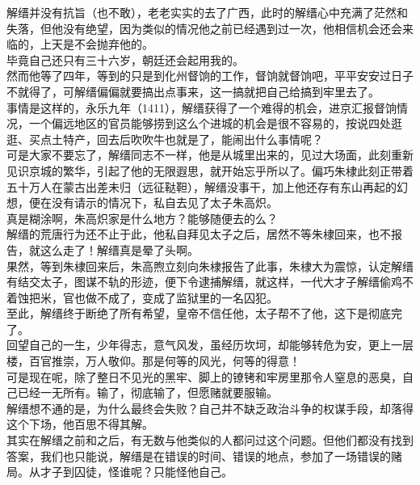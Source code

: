 \begin{multicols}{\theparacolNo}
解缙并没有抗旨（也不敢），老老实实的去了广西，此时的解缙心中充满了茫然和失落，但他没有绝望，因为类似的情况他之前已经遇到过一次，他相信机会还会来临的，上天是不会抛弃他的。\\

毕竟自己还只有三十六岁，朝廷还会起用我的。\\

然而他等了四年，等到的只是到化州督饷的工作，督饷就督饷吧，平平安安过日子不就得了，可解缙偏偏就要搞出点事来，这一搞就把自己给搞到牢里去了。\\

事情是这样的，永乐九年（1411），解缙获得了一个难得的机会，进京汇报督饷情况，一个偏远地区的官员能够捞到这么个进城的机会是很不容易的，按说四处逛逛、买点土特产，回去后吹吹牛也就是了，能闹出什么事情呢？\\

可是大家不要忘了，解缙同志不一样，他是从城里出来的，见过大场面，此刻重新见识京城的繁华，引起了他的无限遐思，就开始忘乎所以了。偏巧朱棣此刻正带着五十万人在蒙古出差未归（远征鞑靼），解缙没事干，加上他还存有东山再起的幻想，便在没有请示的情况下，私自去见了太子朱高炽。\\

真是糊涂啊，朱高炽家是什么地方？能够随便去的么？\\

解缙的荒唐行为还不止于此，他私自拜见太子之后，居然不等朱棣回来，也不报告，就这么走了！解缙真是晕了头啊。\\

果然，等到朱棣回来后，朱高煦立刻向朱棣报告了此事，朱棣大为震惊，认定解缙有结交太子，图谋不轨的形迹，便下令逮捕解缙，就这样，一代大才子解缙偷鸡不着蚀把米，官也做不成了，变成了监狱里的一名囚犯。\\

至此，解缙终于断绝了所有希望，皇帝不信任他，太子帮不了他，这下是彻底完了。\\

回望自己的一生，少年得志，意气风发，虽经历坎坷，却能够转危为安，更上一层楼，百官推崇，万人敬仰。那是何等的风光，何等的得意！\\

可是现在呢，除了整日不见光的黑牢、脚上的镣铐和牢房里那令人窒息的恶臭，自己已经一无所有。输了，彻底输了，但愿赌就要服输。\\

解缙想不通的是，为什么最终会失败？自己并不缺乏政治斗争的权谋手段，却落得这个下场，他百思不得其解。\\

其实在解缙之前和之后，有无数与他类似的人都问过这个问题。但他们都没有找到答案，我们也只能说，解缙是在错误的时间、错误的地点，参加了一场错误的赌局。从才子到囚徒，怪谁呢？只能怪他自己。\\


\end{multicols}
